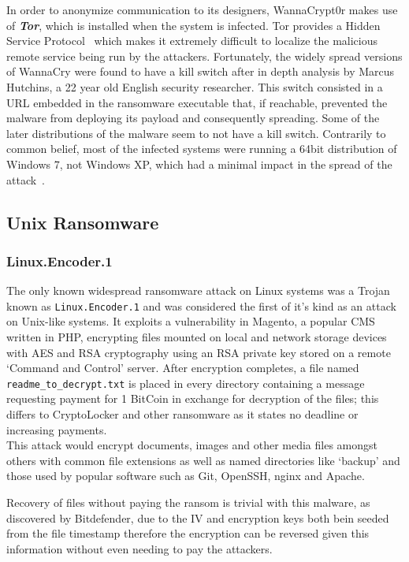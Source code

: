 \documentclass[10pt,a4paper]{article}
\begin{document}
In order to anonymize communication to its designers, WannaCrypt0r makes use of \textit{\textbf{Tor}}, which is installed when the system is infected. Tor provides a Hidden Service Protocol~\cite{torcircuits} which makes it extremely difficult to localize the malicious remote service being run by the attackers.
Fortunately, the widely spread versions of WannaCry were found to have a kill switch after in depth analysis by Marcus Hutchins, a 22 year old English security researcher. This switch consisted in a URL  embedded in the ransomware executable that, if reachable, prevented the malware from deploying its payload and consequently spreading. Some of the later distributions of the malware seem to not have a kill switch. Contrarily to common belief, most of the infected systems were running a 64bit distribution of Windows 7, not Windows XP, which had a minimal impact in the spread of the attack~\cite{wanacrySystems}.

\subsection{Unix Ransomware}

\subsubsection{Linux.Encoder.1}

The only known widespread ransomware attack on Linux systems was a Trojan known as \texttt{Linux.Encoder.1} and was considered the first of it's kind as an attack on Unix-like systems. It exploits a vulnerability in Magento, a popular CMS written in PHP, encrypting files mounted on local and network storage devices with AES and RSA cryptography using an RSA private key stored on a remote `Command and Control' server. After encryption completes, a file named \texttt{readme\_to\_decrypt.txt} is placed in every directory containing a message requesting payment for 1 BitCoin in exchange for decryption of the files; this differs to CryptoLocker and other ransomware as it states no deadline or increasing payments.\\
This attack would encrypt documents, images and other media files amongst others with common file extensions as well as named directories like `backup' and those used by popular software such as Git, OpenSSH, nginx and Apache.

Recovery of files without paying the ransom is trivial with this malware, as discovered by Bitdefender, due to the IV and encryption keys both bein seeded from the file timestamp therefore the encryption can be reversed given this information without even needing to pay the attackers.
\end{document}
